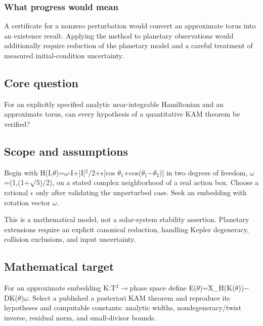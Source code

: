 \documentclass[
  11pt,
]{article}
\begin{document}
\subsubsection{What progress would mean}

A certificate for a nonzero perturbation would convert an approximate
torus into an existence result. Applying the method to planetary
observations would additionally require reduction of the planetary model
and a careful treatment of measured initial-condition uncertainty.

\subsection{Core question}

For an explicitly specified analytic near-integrable Hamiltonian and an
approximate torus, can every hypothesis of a quantitative KAM theorem be
verified?

\subsection{Scope and assumptions}

Begin with
H(I,\ensuremath{\theta})=\ensuremath{\omega}\ensuremath{\cdot}I+|I|\ensuremath{{}^{2}}/2+\ensuremath{\epsilon}[cos
\ensuremath{\theta}\ensuremath{{}_{1}}+cos(\ensuremath{\theta}\ensuremath{{}_{1}}\ensuremath{-}\ensuremath{\theta}\ensuremath{{}_{2}})]
in two degrees of freedom,
\ensuremath{\omega}=(1,(1+\ensuremath{\surd}5)/2), on a stated complex
neighborhood of a real action box. Choose a rational
\ensuremath{\epsilon} only after validating the unperturbed case. Seek
an embedding with rotation vector \ensuremath{\omega}.

This is a mathematical model, not a solar-system stability assertion.
Planetary extensions require an explicit canonical reduction, handling
Kepler degeneracy, collision exclusions, and input uncertainty.

\subsection{Mathematical target}

For an approximate embedding K:T\ensuremath{{}^{2}}\ensuremath{\to}phase
space define
E(\ensuremath{\theta})=X\_H(K(\ensuremath{\theta}))\ensuremath{-}DK(\ensuremath{\theta})\ensuremath{\omega}.
Select a published a posteriori KAM theorem and reproduce its hypotheses
and computable constants: analytic widths, nondegeneracy/twist inverse,
residual norm, and small-divisor bounds.
\end{document}
